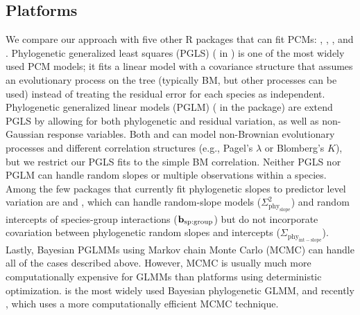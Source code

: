 \documentclass[12pt]{article}
\begin{document}
\subsection*{Platforms}

We compare our approach with five other R packages that can fit PCMs:  \citep{pinheiro2014r},  \citep{ho2014phylolm},  \citep{pearse2015pez},  \citep{phyr} and  \citep{burkner2018brms}.
Phylogenetic generalized least squares (PGLS) ( in ) is one of the most widely used PCM models; it fits a linear model with a covariance structure that assumes an evolutionary process on the tree (typically BM, but other processes can be used) instead of treating the residual error for each species as independent.
Phylogenetic generalized linear models (PGLM) ( in the  package) are extend PGLS by allowing for both phylogenetic and residual variation, as well as non-Gaussian response variables.
Both  and  can model non-Brownian evolutionary processes and different correlation structures (e.g., Pagel's $\lambda$ or Blomberg's $K$), but we restrict our PGLS fits to the simple BM correlation.
Neither PGLS nor PGLM can handle random slopes or multiple observations within a species.
Among the few packages that currently fit phylogenetic slopes to predictor level variation are  and , which can handle random-slope models ($\Sigma^2_{\mathrm{phy_{slope}}}$) and random intercepts of species-group interactions ($\bf{b_{\mathrm{sp:group}}}$) but do not incorporate covariation between phylogenetic random slopes and intercepts ($\Sigma_{\mathrm{phy_{int-slope}}}$).
Lastly, Bayesian PGLMMs using Markov chain Monte Carlo (MCMC) can handle all of the cases described above. 
However, MCMC is usually much more computationally expensive for GLMMs than platforms using deterministic optimization.
 \citep{hadfield2010general} is the most widely used Bayesian phylogenetic GLMM, and recently , which uses a more computationally efficient MCMC technique.
 
\end{document}
